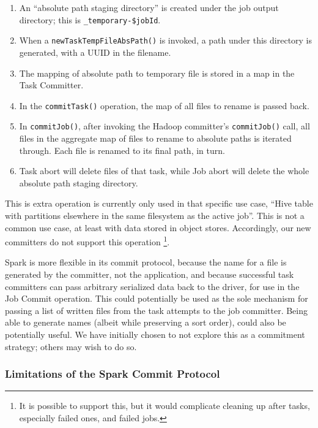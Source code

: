 \documentclass[conference]{IEEEtran}
\begin{document}
\begin{enumerate}
  \item An ``absolute path staging directory'' is created under the job output
  directory;
  this is \texttt{_temporary-\$jobId}.
  \item When a \texttt{newTaskTempFileAbsPath()} is invoked, a path under this
  directory is generated, with a UUID in the filename.
  \item The mapping of absolute path to temporary file is stored in a map in the Task Committer.
  \item In the \texttt{commitTask()} operation, the map of all files to rename is passed back.
  \item In \texttt{commitJob()}, after invoking the Hadoop committer's \texttt{commitJob()}
  call, all files in the aggregate map of files to rename to absolute paths is iterated through.
  Each file is renamed to its final path, in turn.
  \item Task abort will delete files of that task, while Job abort will delete
  the whole absolute path staging directory.
\end{enumerate}

This is extra operation is currently only used in that specific use case,
``Hive table with partitions elsewhere in the same filesystem as the active job''.
This is not a common use case, at least with data stored in object stores.
Accordingly, our new committers do not support this operation
\footnote{It is possible to support this, but it would complicate cleaning up
after tasks, especially failed ones, and failed jobs.}.

Spark is more flexible in its commit protocol, because
the name for a file is generated by the committer, not the application,
and because successful task committers can pass arbitrary serialized data back
to the driver, for use in the Job Commit operation.
This could potentially be used as the sole mechanism for passing a list
of written files from the task attempts to the job committer.
Being able to generate names (albeit while preserving a sort order), could
also be potentially useful.
We have initially chosen to not explore this as a commitment strategy;
others may wish to do so.



\subsubsection{Limitations of the Spark Commit Protocol}
\end{document}
